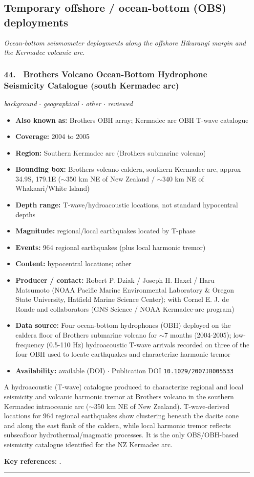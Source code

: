 \documentclass[10pt,a4paper]{article}
\newcommand{\catentryrule}{\par\vspace{3pt}\noindent\textcolor{rulegrey}{\rule{\linewidth}{0.3pt}}\par\vspace{5pt}}
\newcommand{\kv}[2]{\item \textbf{#1:} #2}
\begin{document}
\subsection{Temporary offshore / ocean-bottom (OBS) deployments}
\textit{Ocean-bottom seismometer deployments along the offshore Hikurangi margin and the Kermadec volcanic arc.}\par\vspace{4pt}
\subsubsection*{\hypertarget{c:44}{44.}~ Brothers Volcano Ocean-Bottom Hydrophone Seismicity Catalogue (south Kermadec arc)}
{\small\itshape background $\cdot$ geographical $\cdot$ other $\cdot$ reviewed}\par\vspace{2pt}
\begin{itemize}[leftmargin=1.3em,itemsep=0.6pt,topsep=1pt,parsep=0pt]
\kv{Also known as}{Brothers OBH array; Kermadec arc OBH T-wave catalogue}
\kv{Coverage}{2004 to 2005}
\kv{Region}{Southern Kermadec arc (Brothers submarine volcano)}
\kv{Bounding box}{Brothers volcano caldera, southern Kermadec arc, approx 34.9S, 179.1E ($\sim$350 km NE of New Zealand / $\sim$340 km NE of Whakaari/White Island)}
\kv{Depth range}{T-wave/hydroacoustic locations, not standard hypocentral depths}
\kv{Magnitude}{regional/local earthquakes located by T-phase}
\kv{Events}{964 regional earthquakes (plus local harmonic tremor)}
\kv{Content}{hypocentral locations; other}
\kv{Producer / contact}{Robert P. Dziak / Joseph H. Haxel / Haru Matsumoto (NOAA Pacific Marine Environmental Laboratory \& Oregon State University, Hatfield Marine Science Center); with Cornel E. J. de Ronde and collaborators (GNS Science / NOAA Kermadec-arc program)}
\kv{Data source}{Four ocean-bottom hydrophones (OBH) deployed on the caldera floor of Brothers submarine volcano for $\sim$7 months (2004-2005); low-frequency (0.5-110 Hz) hydroacoustic T-wave arrivals recorded on three of the four OBH used to locate earthquakes and characterize harmonic tremor}
\kv{Availability}{available (DOI) $\cdot$ Publication DOI \href{https://doi.org/10.1029/2007JB005533}{\nolinkurl{10.1029/2007JB005533}}}
\end{itemize}
\par\vspace{2pt}A hydroacoustic (T-wave) catalogue produced to characterize regional and local seismicity and volcanic harmonic tremor at Brothers volcano in the southern Kermadec intraoceanic arc ($\sim$350 km NE of New Zealand). T-wave-derived locations for 964 regional earthquakes show clustering beneath the dacite cone and along the east flank of the caldera, while local harmonic tremor reflects subseafloor hydrothermal/magmatic processes. It is the only OBS/OBH-based seismicity catalogue identified for the NZ Kermadec arc.
\par\vspace{2pt}\textbf{Key references:} \cite{Dziak2008}.
\catentryrule
\end{document}
